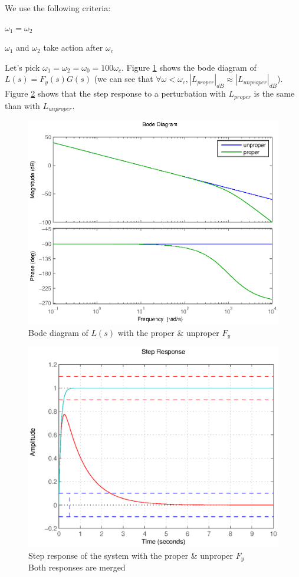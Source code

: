 We use the following criteria:

\begin{shortitemize}
    \item $\omega_1 = \omega_2$
    \item $\omega_1$ and $\omega_2$ take action after $\omega_c$ 
\end{shortitemize}

Let's pick $\omega_1 = \omega_2 = \omega_0 = 100\omega_c$.
Figure \ref{bodeProper421} shows the bode diagram of $L(s) = F_y(s) G(s)$ (we can see that $\forall \omega < \omega_c, |L_{proper}|_{dB} \approx |L_{unproper}|_{dB}$).
Figure \ref{stepProper421} shows that the step response to a perturbation with $L_{proper}$ is the same than with $L_{unproper}$.

\begin{figure}[h!t]
    \includegraphics[width=\columnwidth]{fig/bodeProper421.eps}
    \caption{Bode diagram of $L(s)$ with the proper \& unproper $F_y$} 
    \label{bodeProper421}
\end{figure}

\begin{figure}[h!t]
    \includegraphics[width=\columnwidth]{fig/stepProper421bis.eps}
    \caption{Step response of the system with the proper \& unproper $F_y$ \\ Both responses are merged} 
    \label{stepProper421}
\end{figure}

